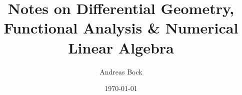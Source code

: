 \documentclass[11pt]{report}
\def\Author{Andreas Bock}
\begin{document}
\title{Notes on Differential Geometry, Functional Analysis \& Numerical Linear Algebra}
\author{\Author}
\date{\today}
\maketitle
\tableofcontents






%
%
%

\printbibliography
\end{document}
